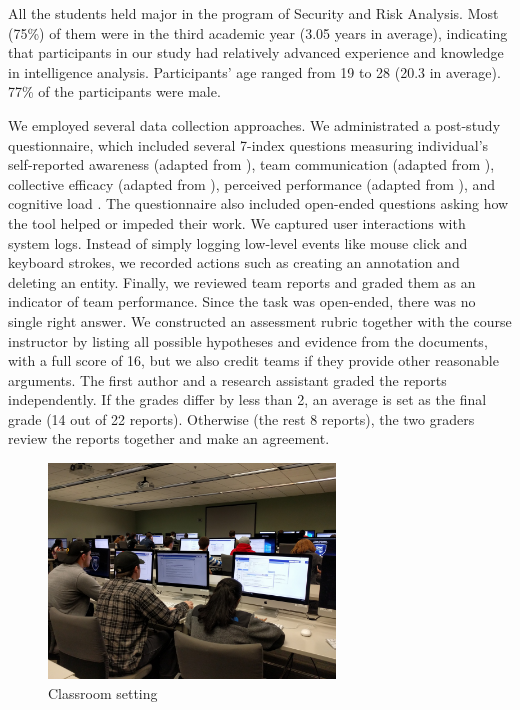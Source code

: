 All the students held major in the program of Security and Risk
Analysis. Most (75\%) of them were in the third academic year (3.05
years in average), indicating that participants in our study had
relatively advanced experience and knowledge in intelligence analysis.
Participants' age ranged from 19 to 28 (20.3 in average). 77\% of the
participants were male.

We employed several data collection approaches. We administrated a
post-study questionnaire, which included several 7-index questions
measuring individual's self-reported awareness (adapted from
\autocite{Convertino2011}), team communication (adapted from
\autocite{Convertino2011}), collective efficacy (adapted from
\autocite{Convertino2011}), perceived performance (adapted from
\autocite{Goyal2014}), and cognitive load \autocite{Hart1988}. The
questionnaire also included open-ended questions asking how the tool
helped or impeded their work. We captured user interactions with system
logs. Instead of simply logging low-level events like mouse click and
keyboard strokes, we recorded actions such as creating an annotation and
deleting an entity. Finally, we reviewed team reports and graded them as
an indicator of team performance. Since the task was open-ended, there
was no single right answer. We constructed an assessment rubric together
with the course instructor by listing all possible hypotheses and
evidence from the documents, with a full score of 16, but we also credit
teams if they provide other reasonable arguments. The first author and a
research assistant graded the reports independently. If the grades
differ by less than 2, an average is set as the final grade (14 out of
22 reports). Otherwise (the rest 8 reports), the two graders review the
reports together and make an agreement.

\begin{figure}
\centering
\includegraphics[width=3in]{./img/classroom_setting.jpg}
\caption{Classroom setting}\label{fig:classroom}
\end{figure}

